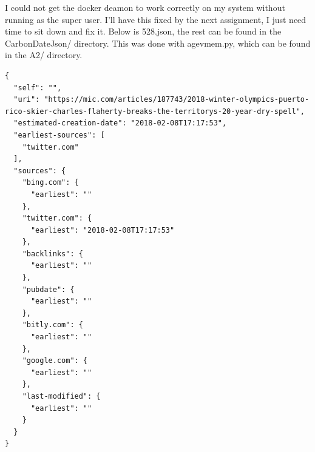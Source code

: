 \documentclass{article}
\begin{document}
I could not get the docker deamon to work correctly on my system without running as the super user. I'll have this fixed by the next assignment, I just need time to sit down and fix it. Below is 528.json, the rest can be found in the CarbonDateJson/ directory. This was done with agevmem.py, which can be found in the A2/ directory.
\begin{lstlisting}
{
  "self": "",
  "uri": "https://mic.com/articles/187743/2018-winter-olympics-puerto-rico-skier-charles-flaherty-breaks-the-territorys-20-year-dry-spell",
  "estimated-creation-date": "2018-02-08T17:17:53",
  "earliest-sources": [
    "twitter.com"
  ],
  "sources": {
    "bing.com": {
      "earliest": ""
    },
    "twitter.com": {
      "earliest": "2018-02-08T17:17:53"
    },
    "backlinks": {
      "earliest": ""
    },
    "pubdate": {
      "earliest": ""
    },
    "bitly.com": {
      "earliest": ""
    },
    "google.com": {
      "earliest": ""
    },
    "last-modified": {
      "earliest": ""
    }
  }
}
\end{lstlisting}
\end{document}
